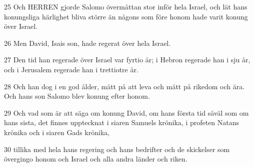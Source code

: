 \par 25 Och HERREN gjorde Salomo övermåttan stor inför hela Israel, och lät hans konungsliga härlighet bliva större än någons som före honom hade varit konung över Israel.
\par 26 Men David, Isais son, hade regerat över hela Israel.
\par 27 Den tid han regerade över Israel var fyrtio år; i Hebron regerade han i sju år, och i Jerusalem regerade han i trettiotre år.
\par 28 Och han dog i en god ålder, mätt på att leva och mätt på rikedom och ära. Och hans son Salomo blev konung efter honom.
\par 29 Och vad som är att säga om konung David, om hans första tid såväl som om hans sista, det finnes upptecknat i siaren Samuels krönika, i profeten Natans krönika och i siaren Gads krönika,
\par 30 tillika med hela hans regering och hans bedrifter och de skickelser som övergingo honom och Israel och alla andra länder och riken.


